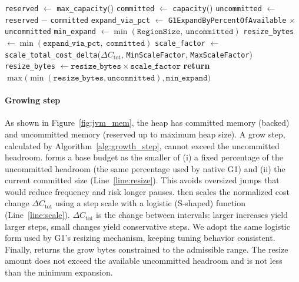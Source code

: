 \begin{algorithm}[h]
	\caption{Growing step}
	\label{alg:growth_step}
	\begin{algorithmic}[1]
		\State \texttt{reserved} \(\gets\) \texttt{max\_capacity}()
		\State \texttt{committed} \(\gets\) \texttt{capacity}()
		\State \texttt{uncommitted} \(\gets\) \texttt{reserved} \(-\) \texttt{committed}
		\State \texttt{expand\_via\_pct} \(\gets\) \texttt{G1ExpandByPercentOfAvailable} \(\times\) \texttt{uncommitted}
		\State \texttt{min\_expand} \(\gets \min(\texttt{RegionSize},\ \texttt{uncommitted})\)
		\State \texttt{resize\_bytes} \(\gets \min(\texttt{expand\_via\_pct},\ \texttt{committed})\) \label{line:resize}
		\State \texttt{scale\_factor} \(\gets\) \texttt{scale\_total\_cost\_delta}(\(\Delta C_{\text{tot}}\), \texttt{MinScaleFactor}, \texttt{MaxScaleFactor}) \label{line:scale}
		\State \texttt{resize\_bytes} \(\gets \texttt{resize\_bytes} \times \texttt{scale\_factor} \)
		\State \textbf{return} \(\max\!\big(\min(\texttt{resize\_bytes}, \texttt{uncommitted}), \texttt{min\_expand}\big)\)
		\EndProcedure
	\end{algorithmic}
\end{algorithm}

\paragraph{\textbf{Growing step}}
As shown in Figure~\ref{fig:jvm_mem}, the heap has committed memory (backed) and uncommitted memory (reserved up to maximum heap size).
A grow step, calculated by Algorithm~\ref{alg:growth_step}, cannot exceed the uncommitted headroom.
\flexheapName{} forms a base budget as the smaller of (i) a fixed percentage of the uncommitted headroom (the same percentage used by native G1) and (ii) the current committed size (Line~\ref{line:resize}).
This avoids oversized jumps that would reduce \flexheapGC{} frequency and risk longer pauses.
\flexheapName{} then scales the normalized cost change $\Delta C_{\text{tot}}$ using a step scale with a logistic (S-shaped) function (Line~\ref{line:scale}).
$\Delta C_{\text{tot}}$ is the change between intervals: larger increases yield larger steps, small changes yield conservative steps.
We adopt the same logistic form used by G1’s resizing mechanism, keeping tuning behavior consistent.
Finally, \flexheapName{} returns the grow bytes constrained to the admissible range.
The resize amount does not exceed the available uncommitted headroom and is not less than the minimum expansion.

